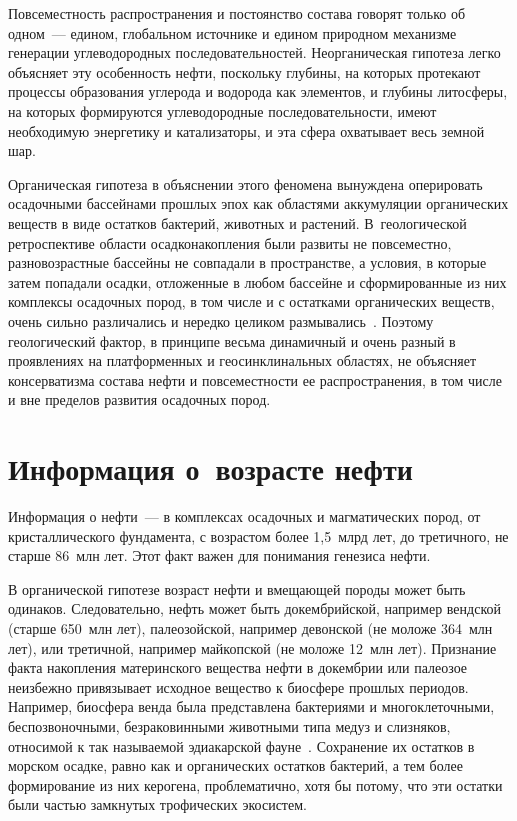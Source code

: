 \begin{multicols}{2}
     Повсеместность распространения и постоянство состава говорят только об 
одном~--- едином, глобальном источнике и едином природном механизме 
генерации углеводородных последовательностей. Неорганическая гипотеза легко 
объясняет эту особенность нефти, поскольку глубины, на которых протекают 
процессы образования углерода и водорода как элементов, и глубины литосферы, 
на которых формируются углеводородные последовательности, имеют 
необходимую энергетику и катализаторы, и эта сфера охватывает весь земной шар. 
     
     Органическая гипотеза в объяснении этого феномена вынуждена оперировать 
осадочными бассейнами прошлых эпох как областями аккумуляции органических 
веществ в виде остатков бактерий, животных и растений. В~геологической 
ретроспективе области осадконакопления были развиты не повсеместно, 
разновозрастные бассейны не совпадали в пространстве, а условия, в которые затем 
попадали осадки, отложенные в любом бассейне и сформированные из них 
комплексы осадочных пород, в том числе и с остатками органических веществ, 
очень сильно различались и нередко целиком размывались~\cite{19s}. Поэтому 
геологический фактор, в принципе весьма динамичный и очень разный в 
проявлениях на платформенных и геосинклинальных областях, не объясняет 
консерватизма состава нефти и повсеместности ее распространения, в том числе и 
вне пределов развития осадочных пород. 
     
\section{Информация о~возрасте нефти}

     Информация о нефти~--- в комплексах осадочных и магматических пород, от 
кристаллического фундамента, с возрастом более 1,5~млрд лет, до третичного, не 
старше 86~млн лет. Этот факт важен для понимания генезиса нефти. 
     
     В органической гипотезе возраст нефти и вмещающей породы может быть 
одинаков. Следовательно, нефть может быть докембрийской, напри\-мер вендской 
(старше 650~млн лет), палеозойской, например девонской (не моложе 364~млн 
лет), или третичной, например майкопской (не моложе 12~млн лет). Признание 
факта накопления материнского вещества нефти в докембрии или палеозое 
неизбежно привязывает исходное вещество к биосфере прошлых периодов. 
Например, биосфера венда была представлена бактериями и многоклеточными, 
беспозвоночными, безраковинными животными типа медуз и слизняков, 
относимой к так называемой эдиакарской фауне~\cite{14s}. Сохранение их 
остатков в морском осадке, равно как и органических остатков бактерий, а тем 
более формирование из них керогена, проблематично, хотя бы потому, что эти 
остатки были частью замкнутых трофических экосистем.
     

\end{multicols}
